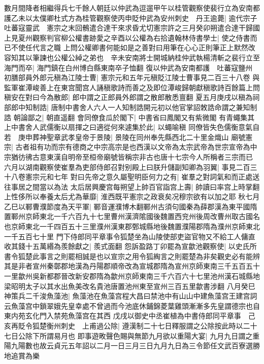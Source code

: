 數月間降者相繼得兵七千餘人朝廷以仲武為逗遛甲午以桂管觀察使裴行立為安南都護乙未以太僕卿杜式方為桂管觀察使丙申貶仲武為安州刺史　丹王逾薨|{
	逾代宗子}
吐蕃寇靈武　憲宗之末回鶻遣合達干來求昏尤切憲宗許之三月癸卯朔遣合達干歸國　上見夏州觀察判官柳公權書跡愛之辛酉以公權為右拾遺翰林侍書學士|{
	使之侍書而已不使任代言之職}
上問公權卿書何能如是之善對曰用筆在心心正則筆正上默然改容知其以筆諫也公權公綽之弟也　辛未安南將士開城納桂仲武執楊清斬之裴行立至海門而卒|{
	海門鎮在白州博白縣東南卒子恤翻}
復以仲武為安南都護　吐蕃寇鹽州　初膳部員外郎元稹為江陵士曹|{
	憲宗元和五年元稹貶江陵士曹事見二百三十八卷}
與監軍崔潭峻善上在東宫聞宫人誦稹歌詩而善之及即位潭峻歸朝獻稹歌詩百餘篇上問稹安在對曰今為散郎|{
	郎中謂之正郎員外郎謂之散郎散悉亶翻}
夏五月庚戌以稹為祠部郎中知制誥|{
	唐制中書舍人六人一人知制誥開元初以他官掌詔敇誥命謂之兼知制誥}
朝論鄙之|{
	朝直遥翻}
會同僚食瓜於閣下|{
	中書省曰鳳閣又有紫微閣}
有青蠅集其上中書舍人武儒衡以扇揮之曰適從何來遽集於此|{
	以蠅喻稹}
同僚皆失色儒衡意氣自若　庚申葬神聖章武孝皇帝于景陵|{
	景陵在同州奉先縣西北二十里金熾山}
廟號憲宗|{
	古者祖有功而宗有德商之中宗高宗是也西漢以文帝為太宗武帝為世宗宣帝為中宗猶彷彿古意東漢自明帝至桓帝廟號皆稱宗非古也唐十七宗今人所稱者三宗而已}
六月以湖南觀察使崔羣為吏部侍郎召對别殿上曰朕升儲副知卿為羽翼|{
	事見二百三十八卷憲宗元和七年}
對曰先帝之意久屬聖明臣何力之有|{
	崔羣之對詞氣和而正處送往事居之間當以為法}
太后居興慶宫每朔望上帥百官詣宫上壽|{
	帥讀曰率宫上時掌翻}
上性侈所以奉養太后尤為華靡|{
	淮西既平憲宗之政衰矣况穆宗欲有以加之耶}
秋七月乙巳以鄆曹濮節度為天平軍|{
	鄆音運濮博木翻鄆州古須句國秦為薛郡漢為東平國隋置鄆州京師東北一千六百九十七里曹州漢濟隂國後魏置西兖州後周改曹州取古國名也京師東北一千四百五十三里濮州漢東郡鄄城縣地後魏置濮陽郡隋為濮州京師東北一千五百七十里}
門下侍郎同平章事令狐楚坐為山陵使部吏盜官物又不給工人傭直收其錢十五萬緡為羨餘獻之|{
	羨式面翻}
怨訴盈路丁卯罷為宣歙池觀察使|{
	以史氏所書令狐楚此事言之則罷相誠是也以宣宗之用令狐綯言之則罷楚為非矣觀史必有能辨其是非者宣州秦鄣郡地漢為丹陽郡順帝改為宣城郡隋為宣州京師東南三千五百五十一里歙州吳新都郡晉改新安郡隋為歙州京師東南三千六百六十七里池州漢石城縣地梁昭明太子以其水出魚美改名貴池唐置池州東至宣州三百五里歙書涉翻}
八月癸巳神策兵二千浚魚藻池|{
	魚藻池在魚藻宫程大昌曰禁池中有山山中建魚藻宫王建宫詞云魚藻宫中鎖翠娥先皇幸處不曾過而今池底休鋪錦菱葉雞頭漸漸多先皇謂德宗也自東内苑玄化門入禁苑魚藻宫在其西}
戊戌以御史中丞崔植為中書侍郎同平章事　己亥再貶令狐楚衡州刺史　上甫過公除|{
	遵漢制二十七日釋服謂之公除按此時以二十七日公除下所謂易月也}
即事遊畋聲色賜與無節九月欲以重陽大宴|{
	九月九日謂之重陽九陽數也故云貞元五年詔以二月一日三月三日九月九日為三令節任文武百寮選勝地追賞為樂}
